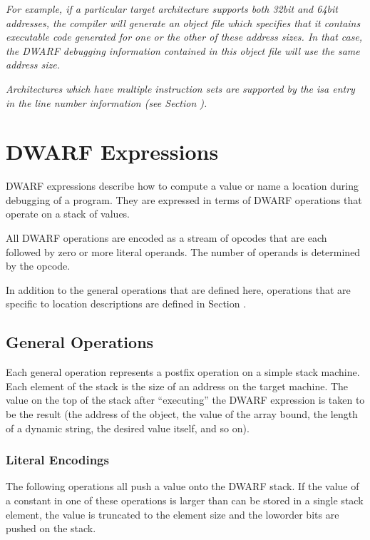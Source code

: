 \textit{
For example, if a particular target architecture supports
both 32\dash bit and 64\dash bit addresses, the compiler will generate
an object file which specifies that it contains executable
code generated for one or the other of these address sizes. In
that case, the DWARF debugging information contained in this
object file will use the same address size.
}

\textit{
Architectures which have multiple instruction sets are
supported by the isa entry in the line number information
(see Section ).
}


\section{DWARF Expressions}
\label{chap:dwarfexpressions}
DWARF expressions describe how to compute a value or name a
location during debugging of a program. 
They are expressed in
terms of DWARF operations that operate on a stack of values.

All DWARF operations are encoded as a stream of opcodes that
are each followed by zero or more literal operands. 
The number
of operands is determined by the opcode.  

In addition to the
general operations that are defined here, operations that are
specific to location descriptions are defined in 
Section  .

\subsection{General Operations}
\label{chap:generaloperations}
Each general operation represents a postfix operation on
a simple stack machine. Each element of the stack is the
size of an address on the target machine. The value on the
top of the stack after ``executing'' the DWARF expression
is taken to be the result (the address of the object, the
value of the array bound, the length of a dynamic string,
the desired value itself, and so on).

\subsubsection{Literal Encodings}
\label{chap:literalencodings}
The following operations all push a value onto the DWARF
stack. If the value of a constant in one of these operations
is larger than can be stored in a single stack element, the
value is truncated to the element size and the low\dash order bits
are pushed on the stack.

